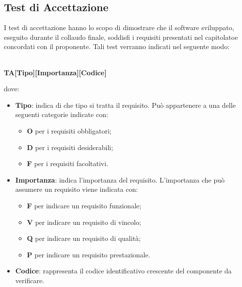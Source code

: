 \subsection{Test di Accettazione}
I test di accettazione hanno lo scopo di dimostrare che il software sviluppato, eseguito durante il collaudo finale, soddisfi i requisiti presentati nel capitolato\glosp e concordati con il proponente. Tali test verranno indicati nel seguente modo: \\ \\
	\centerline{\textbf{TA[Tipo][Importanza][Codice]}}
dove:
\begin{itemize}
	\item \textbf{Tipo}: indica di che tipo si tratta il requisito. Può appartenere a una delle seguenti categorie indicate con:
		\begin{itemize}
			\item \textbf{O} per i requisiti obbligatori;
			\item \textbf{D} per i requisiti desiderabili;
			\item \textbf{F} per i requisiti facoltativi.			
		\end{itemize}
	\item \textbf{Importanza}: indica l'importanza del requisito. L'importanza che può assumere un requisito viene indicata con:
		\begin{itemize}
			\item \textbf{F} per indicare un requisito funzionale;
			\item \textbf{V} per indicare un requisito di vincolo;
			\item \textbf{Q} per indicare un requisito di qualità;
			\item \textbf{P} per indicare un requisito prestazionale. 
		\end{itemize}
	\item \textbf{Codice}: rappresenta il codice identificativo crescente del componente da verificare.
\end{itemize}

	\renewcommand{\arraystretch}{1.5}
	
